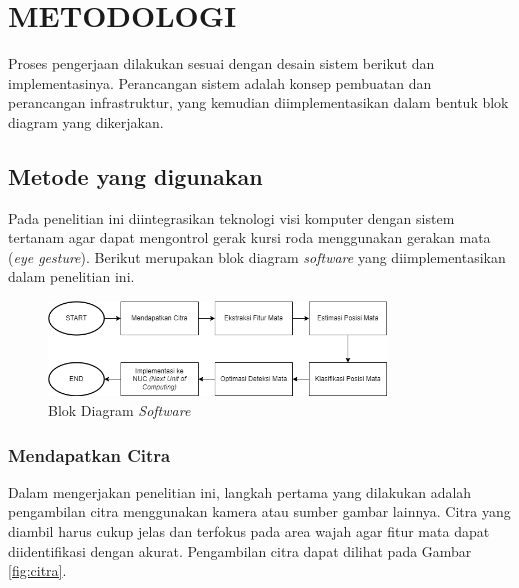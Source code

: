 \chapter{METODOLOGI}
\label{chap:metodologi}


Proses pengerjaan dilakukan sesuai dengan desain sistem berikut dan implementasinya. Perancangan sistem adalah konsep pembuatan dan perancangan infrastruktur, yang kemudian diimplementasikan dalam bentuk blok diagram yang dikerjakan.

\section{Metode yang digunakan}
\label{sec:deskripsisistem}
Pada penelitian ini diintegrasikan teknologi visi komputer dengan sistem tertanam agar dapat mengontrol gerak kursi roda menggunakan gerakan mata (\emph{eye gesture}). Berikut merupakan blok diagram \emph{software} yang diimplementasikan dalam penelitian ini.

\begin{figure} [H] \centering
  \includegraphics[width=0.8\textwidth]{gambar/bab3/software.png}
  \caption{Blok Diagram \textit{Software}}
  \label{fig:software}
\end{figure}

\subsection{Mendapatkan Citra}

Dalam mengerjakan penelitian ini, langkah pertama yang dilakukan adalah pengambilan citra menggunakan kamera atau sumber gambar lainnya. Citra yang diambil harus cukup jelas dan terfokus pada area wajah agar fitur mata dapat diidentifikasi dengan akurat. Pengambilan citra dapat dilihat pada Gambar \ref{fig:citra}.\\

